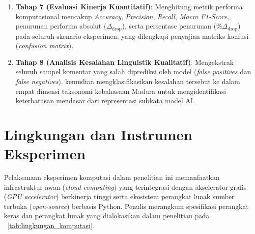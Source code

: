 \begin{enumerate}
    \item \textbf{Tahap 7 (Evaluasi Kinerja Kuantitatif)}: Menghitung metrik performa komputasional mencakup \textit{Accuracy}, \textit{Precision}, \textit{Recall}, \textit{Macro F1-Score}, penurunan performa absolut ($\Delta_{\text{drop}}$), serta persentase penurunan ($\%\Delta_{\text{drop}}$) pada seluruh skenario eksperimen, yang dilengkapi penyajian matriks konfusi (\textit{confusion matrix}).
    \item \textbf{Tahap 8 (Analisis Kesalahan Linguistik Kualitatif)}: Mengekstrak seluruh sampel komentar yang salah diprediksi oleh model (\textit{false positives} dan \textit{false negatives}), kemudian mengklasifikasikan kesalahan tersebut ke dalam empat dimensi taksonomi kebahasaan Madura untuk mengidentifikasi keterbatasan mendasar dari representasi subkata model AI.
\end{enumerate}

\section{Lingkungan dan Instrumen Eksperimen}

Pelaksanaan eksperimen komputasi dalam penelitian ini memanfaatkan infrastruktur awan (\textit{cloud computing}) yang terintegrasi dengan akselerator grafis (\textit{GPU accelerator}) berkinerja tinggi serta ekosistem perangkat lunak sumber terbuka (\textit{open-source}) berbasis Python. Penulis merangkum spesifikasi perangkat keras dan perangkat lunak yang dialokasikan dalam penelitian pada \tablename~\ref{tab:lingkungan_komputasi}.

